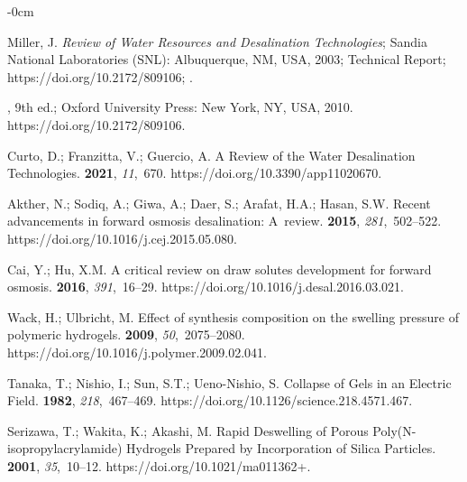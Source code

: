 \documentclass[gels,article,accept,pdftex,moreauthors]{Definitions/mdpi}
\begin{document}
\begin{adjustwidth}{-\extralength}{0cm}
\begin{thebibliography}{999}
Miller, J.
\newblock \emph{Review of Water Resources and Desalination Technologies}; 
Sandia National Laboratories (SNL): Albuquerque, NM, USA, 2003;
\newblock Technical Report; 
\newblock https://doi.org/10.2172/809106; 
.


, 9th ed.; Oxford University Press:
  New York, NY, USA, 2010.
\newblock
  https://doi.org/10.2172/809106.%

Curto, D.; Franzitta, V.; Guercio, A.
\newblock A Review of the Water Desalination Technologies.
 {\bf 2021}, {\em 11},~670.
\newblock
  https://doi.org/10.3390/app11020670.%

Akther, N.; Sodiq, A.; Giwa, A.; Daer, S.; Arafat, H.A.; Hasan, S.W.
\newblock Recent advancements in forward osmosis desalination: A~review.
 {\bf 2015}, {\em 281},~502--522.
\newblock
  https://doi.org/10.1016/j.cej.2015.05.080.%

Cai, Y.; Hu, X.M.
\newblock A critical review on draw solutes development for forward osmosis.
 {\bf 2016}, {\em 391},~16--29.
\newblock
  https://doi.org/10.1016/j.desal.2016.03.021.%

Wack, H.; Ulbricht, M.
\newblock Effect of synthesis composition on the swelling pressure of polymeric
  hydrogels.
 {\bf 2009}, {\em 50},~2075--2080.
\newblock
  https://doi.org/10.1016/j.polymer.2009.02.041.%

Tanaka, T.; Nishio, I.; Sun, S.T.; Ueno-Nishio, S.
\newblock Collapse of Gels in an Electric Field.
 {\bf 1982}, {\em 218},~467--469.
\newblock
  https://doi.org/10.1126/science.218.4571.467.%

Serizawa, T.; Wakita, K.; Akashi, M.
\newblock Rapid Deswelling of Porous Poly(N-isopropylacrylamide) Hydrogels
  Prepared by Incorporation of Silica Particles.
 {\bf 2001}, {\em 35},~10--12.
\newblock
  https://doi.org/10.1021/ma011362+.%


\end{thebibliography}
\end{adjustwidth}
\end{document}
